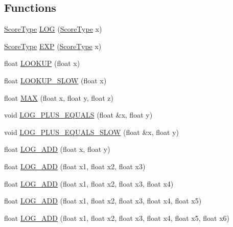 \subsection*{Functions}
\begin{DoxyCompactItemize}
\item 
\hyperlink{namespace_p_r_o_b_c_o_n_s_a93b8c2a0a0de0dd3d36b847946ed288c}{Score\+Type} \hyperlink{namespace_p_r_o_b_c_o_n_s_a67887e64b5e38dd2e82ae6db364b1d0d}{L\+O\+G} (\hyperlink{namespace_p_r_o_b_c_o_n_s_a93b8c2a0a0de0dd3d36b847946ed288c}{Score\+Type} x)
\item 
\hyperlink{namespace_p_r_o_b_c_o_n_s_a93b8c2a0a0de0dd3d36b847946ed288c}{Score\+Type} \hyperlink{namespace_p_r_o_b_c_o_n_s_aa7e1016a9ee998c345adada8e2d1659e}{E\+X\+P} (\hyperlink{namespace_p_r_o_b_c_o_n_s_a93b8c2a0a0de0dd3d36b847946ed288c}{Score\+Type} x)
\item 
float \hyperlink{namespace_p_r_o_b_c_o_n_s_a5b24ca83fd4ec95bdcce003fcf66700a}{L\+O\+O\+K\+U\+P} (float x)
\item 
float \hyperlink{namespace_p_r_o_b_c_o_n_s_a2744e5b759674efe2c2eec891813eb31}{L\+O\+O\+K\+U\+P\+\_\+\+S\+L\+O\+W} (float x)
\item 
float \hyperlink{namespace_p_r_o_b_c_o_n_s_ad6d22c04d26dd86d1a6fd3a3d7cd00ae}{M\+A\+X} (float x, float y, float z)
\item 
void \hyperlink{namespace_p_r_o_b_c_o_n_s_a42a70b7737376d14938ac0135863deb1}{L\+O\+G\+\_\+\+P\+L\+U\+S\+\_\+\+E\+Q\+U\+A\+L\+S} (float \&x, float y)
\item 
void \hyperlink{namespace_p_r_o_b_c_o_n_s_ad87c394a7040cf7ab9ab7038db967ecb}{L\+O\+G\+\_\+\+P\+L\+U\+S\+\_\+\+E\+Q\+U\+A\+L\+S\+\_\+\+S\+L\+O\+W} (float \&x, float y)
\item 
float \hyperlink{namespace_p_r_o_b_c_o_n_s_a45d2b07d0c918cef2ebc0f5d116e443e}{L\+O\+G\+\_\+\+A\+D\+D} (float x, float y)
\item 
float \hyperlink{namespace_p_r_o_b_c_o_n_s_a20d1a1990fc2a2eb3d7af919324d453c}{L\+O\+G\+\_\+\+A\+D\+D} (float x1, float x2, float x3)
\item 
float \hyperlink{namespace_p_r_o_b_c_o_n_s_ae97e1e684a07d63e65e3f2ca7155c148}{L\+O\+G\+\_\+\+A\+D\+D} (float x1, float x2, float x3, float x4)
\item 
float \hyperlink{namespace_p_r_o_b_c_o_n_s_a3ce8799c3d24d8fd1a78b7dd0a5335bf}{L\+O\+G\+\_\+\+A\+D\+D} (float x1, float x2, float x3, float x4, float x5)
\item 
float \hyperlink{namespace_p_r_o_b_c_o_n_s_aae5d50407b95bc0f72cdeb413e2e4fdd}{L\+O\+G\+\_\+\+A\+D\+D} (float x1, float x2, float x3, float x4, float x5, float x6)

\end{DoxyCompactItemize}
